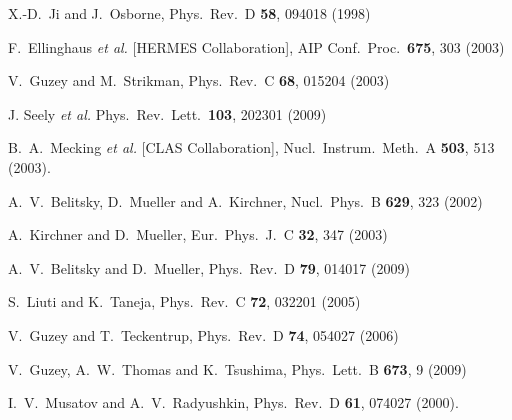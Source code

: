 \documentclass[twocolumn,nofootinbib,showpacs,prl,superscriptaddress,secnumarabic,amssymb,nobibnotes,aps,floatfix]{revtex4}
\begin{document}
\begin{thebibliography}{99}
X.-D.~Ji and J.~Osborne, 
Phys.\ Rev.\ D {\bf 58}, 094018 (1998)

F.~Ellinghaus {\it et al.} [HERMES Collaboration],
AIP Conf.\ Proc.\  {\bf 675}, 303 (2003)

  V.~Guzey and M.~Strikman,
  Phys.\ Rev.\ C {\bf 68}, 015204 (2003)

J. Seely {\it et al.} 
Phys.\ Rev.\ Lett.\ {\bf 103}, 202301 (2009)

   B.~A.~Mecking {\it et al.} [CLAS Collaboration],
   Nucl.\ Instrum.\ Meth.\ A {\bf 503}, 513 (2003).

A.~V.~Belitsky, D.~Mueller and A.~Kirchner,
Nucl.\ Phys.\ B {\bf 629}, 323 (2002)

A.~Kirchner and D.~Mueller, 
Eur.\ Phys.\ J.\ C {\bf 32}, 347 (2003)

A.~V.~Belitsky and D.~Mueller,
Phys.\ Rev.\ D {\bf 79}, 014017 (2009)


S.~Liuti and K.~Taneja, 
Phys.\ Rev.\ C {\bf 72}, 032201 (2005)

V.~Guzey and T.~Teckentrup,
Phys.\ Rev.\ D {\bf 74}, 054027 (2006)

   V.~Guzey, A.~W.~Thomas and K.~Tsushima,
  Phys.\ Lett.\ B {\bf 673}, 9 (2009)


I.~V.~Musatov and A.~V.~Radyushkin, 
Phys.\ Rev.\ D {\bf 61}, 074027 (2000).


\end{thebibliography}
\end{document}
